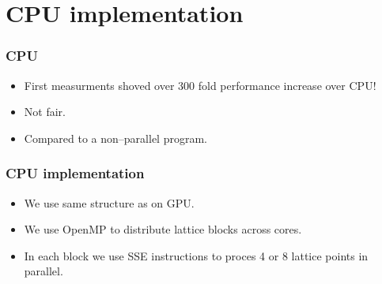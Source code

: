 \documentclass{beamer}
\newcommand{\fillblockgray}[2]{
\pgfmathtruncatemacro\llx{\bksize*(#1)-2}
\pgfmathtruncatemacro\lly{\bksize*(#2)-2}
\pgfmathtruncatemacro\urx{\bksize*(#1+1)+1}
\pgfmathtruncatemacro\ury{\bksize*(#2+1)+1}
\foreach \x in {\llx, ..., \urx}
  \foreach \y in {\lly,...,\ury} {
    \fill[lightgray] (\x, \y) circle(.25);
  }
}
\newcommand{\npartition}[3]{
\pgfmathtruncatemacro\row{Mod(#2,4)}
\ifnum \row = 0
   \pgfmathtruncatemacro\num{Mod(#1,4)}
\else \ifnum \row  = 1
   \pgfmathtruncatemacro\num{Mod(#1,4)+4}
\else \ifnum \row  = 2
   \pgfmathtruncatemacro\num{Mod(Mod(#1,4)+2,4)}
\else \ifnum \row  = 3
   \pgfmathtruncatemacro\num{Mod(Mod(#1,4)+2,4)+4}
\fi
\fi
\fi
\fi
\ifnum \num = #3
\fill[black] (#1, #2) circle(0.35);
\fi

}
\newcommand{\markpartition}[3]{
\pgfmathtruncatemacro\llx{\bksize*(#1)}
\pgfmathtruncatemacro\lly{\bksize*(#2)}
\pgfmathtruncatemacro\urx{\bksize*(#1+1)-1}
\pgfmathtruncatemacro\ury{\bksize*(#2+1)-1}
\foreach \x in {\llx, ..., \urx}
  \foreach \y in {\lly,...,\ury} {
    \npartition{\x}{\y}{#3}
  }
}
\def\bksize{8}
\def\bkcount{4}
\def\lcsize{5}
\begin{document}
\section{CPU implementation}

\begin{frame}
\frametitle{CPU}
\begin{itemize}
\item First measurments shoved over 300 fold  performance increase over CPU!
\item Not fair.
\item Compared to a non--parallel program.
\end{itemize}
\end{frame}



\begin{frame}
\frametitle{CPU implementation}
\begin{itemize}
\item We use same structure as on GPU.
\item We use OpenMP to distribute lattice blocks across cores.
\item In each block we use SSE instructions to proces 4 or 8 lattice points in parallel. 
\end{itemize}
\end{frame}

\begin{frame}

\end{frame}
\end{document}
